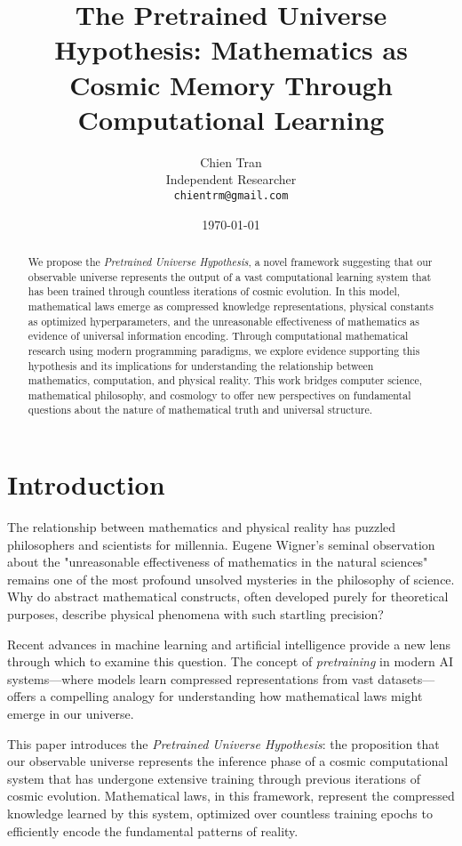 \documentclass[12pt]{article}
\title{The Pretrained Universe Hypothesis: Mathematics as Cosmic Memory Through Computational Learning}
\author{
Chien Tran \\
Independent Researcher \\
\texttt{chientrm@gmail.com}
}
\date{\today}
\begin{document}
\maketitle

\begin{abstract}
We propose the \emph{Pretrained Universe Hypothesis}, a novel framework suggesting that our observable universe represents the output of a vast computational learning system that has been trained through countless iterations of cosmic evolution. In this model, mathematical laws emerge as compressed knowledge representations, physical constants as optimized hyperparameters, and the unreasonable effectiveness of mathematics as evidence of universal information encoding. Through computational mathematical research using modern programming paradigms, we explore evidence supporting this hypothesis and its implications for understanding the relationship between mathematics, computation, and physical reality. This work bridges computer science, mathematical philosophy, and cosmology to offer new perspectives on fundamental questions about the nature of mathematical truth and universal structure.
\end{abstract}

\section{Introduction}

The relationship between mathematics and physical reality has puzzled philosophers and scientists for millennia. Eugene Wigner's seminal observation about the "unreasonable effectiveness of mathematics in the natural sciences" \cite{wigner1960} remains one of the most profound unsolved mysteries in the philosophy of science. Why do abstract mathematical constructs, often developed purely for theoretical purposes, describe physical phenomena with such startling precision?

Recent advances in machine learning and artificial intelligence provide a new lens through which to examine this question. The concept of \emph{pretraining} in modern AI systems—where models learn compressed representations from vast datasets—offers a compelling analogy for understanding how mathematical laws might emerge in our universe.

This paper introduces the \emph{Pretrained Universe Hypothesis}: the proposition that our observable universe represents the inference phase of a cosmic computational system that has undergone extensive training through previous iterations of cosmic evolution. Mathematical laws, in this framework, represent the compressed knowledge learned by this system, optimized over countless training epochs to efficiently encode the fundamental patterns of reality.
\end{document}
